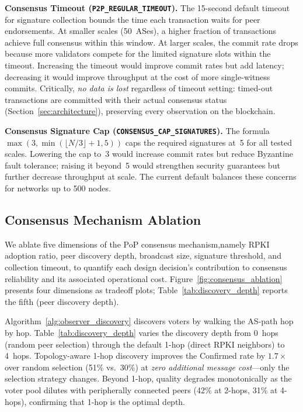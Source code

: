 \documentclass[conference]{IEEEtran}
\newcommand{\BfPara}[1]{\vspace{1mm}{\noindent\textbf{#1.}}\xspace}
\begin{document}
\textbf{Consensus Timeout (\texttt{P2P\_REGULAR\_TIMEOUT}).} The 15-second default timeout for signature collection bounds the time each transaction waits for peer endorsements. At smaller scales (50~ASes), a higher fraction of transactions achieve full consensus within this window. At larger scales, the commit rate drops because more validators compete for the limited signature slots within the timeout. Increasing the timeout would improve commit rates but add latency; decreasing it would improve throughput at the cost of more single-witness commits. Critically, \emph{no data is lost} regardless of timeout setting: timed-out transactions are committed with their actual consensus status (Section~\ref{sec:architecture}), preserving every observation on the blockchain.

\textbf{Consensus Signature Cap (\texttt{CONSENSUS\_CAP\_SIGNATURES}).} The formula $\max(3, \min(\lfloor N/3 \rfloor + 1, 5))$ caps the required signatures at~5 for all tested scales. Lowering the cap to~3 would increase commit rates but reduce Byzantine fault tolerance; raising it beyond~5 would strengthen security guarantees but further decrease throughput at scale. The current default balances these concerns for networks up to 500 nodes.

\subsection{Consensus Mechanism Ablation}
\label{subsec:consensus_ablation}

We ablate five dimensions of the PoP consensus mechanism,namely RPKI adoption ratio, peer discovery depth, broadcast size, signature threshold, and collection timeout, to quantify each design decision's contribution to consensus reliability and its associated operational cost. Figure~\ref{fig:consensus_ablation} presents four dimensions as tradeoff plots; Table~\ref{tab:discovery_depth} reports the fifth (peer discovery depth).

\BfPara{Peer Discovery Depth (Table~\ref{tab:discovery_depth})}
Algorithm~\ref{alg:observer_discovery} discovers voters by walking the AS-path hop by hop. Table~\ref{tab:discovery_depth} varies the discovery depth from 0~hops (random peer selection) through the default 1-hop (direct RPKI neighbors) to 4~hops. Topology-aware 1-hop discovery improves the Confirmed rate by $1.7\times$ over random selection (51\% vs.\ 30\%) at \emph{zero additional message cost}---only the selection strategy changes. Beyond 1-hop, quality degrades monotonically as the voter pool dilutes with peripherally connected peers (42\% at 2-hops, 31\% at 4-hops), confirming that 1-hop is the optimal depth.
\end{document}
